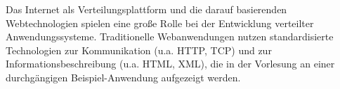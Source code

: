 \begin{module}
\begin{content}
Das Internet als Verteilungsplattform und die darauf basierenden Webtechnologien spielen eine große Rolle bei der Entwicklung verteilter Anwendungssysteme. Traditionelle Webanwendungen nutzen standardisierte Technologien zur Kommunikation (u.a. HTTP, TCP) und zur Informationsbeschreibung (u.a. HTML, XML), die in der Vorlesung an einer durchgängigen Beispiel-Anwendung aufgezeigt werden.


\end{content}



\end{module}

